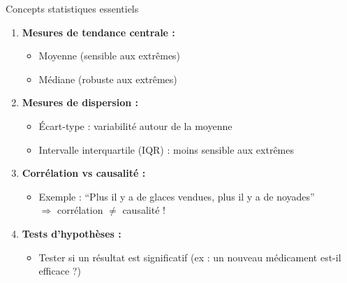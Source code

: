 \begin{frame}{Concepts statistiques essentiels}
  \begin{enumerate}
    \item<+-> \textbf{Mesures de tendance centrale :}
    \begin{itemize}
      \item Moyenne (sensible aux extrêmes)
      \item Médiane (robuste aux extrêmes)
    \end{itemize}

    \item<+-> \textbf{Mesures de dispersion :}
    \begin{itemize}
      \item Écart-type : variabilité autour de la moyenne
      \item Intervalle interquartile (IQR) : moins sensible aux extrêmes
    \end{itemize}

    \item<+-> \textbf{Corrélation vs causalité :}
    \begin{itemize}
      \item Exemple : ``Plus il y a de glaces vendues, plus il y a de noyades'' \\ $\Rightarrow$ corrélation $\neq$ causalité !
    \end{itemize}

    \item<+-> \textbf{Tests d'hypothèses :}
    \begin{itemize}
      \item Tester si un résultat est significatif (ex : un nouveau médicament est-il efficace ?)
    \end{itemize}
  \end{enumerate}
\end{frame}

